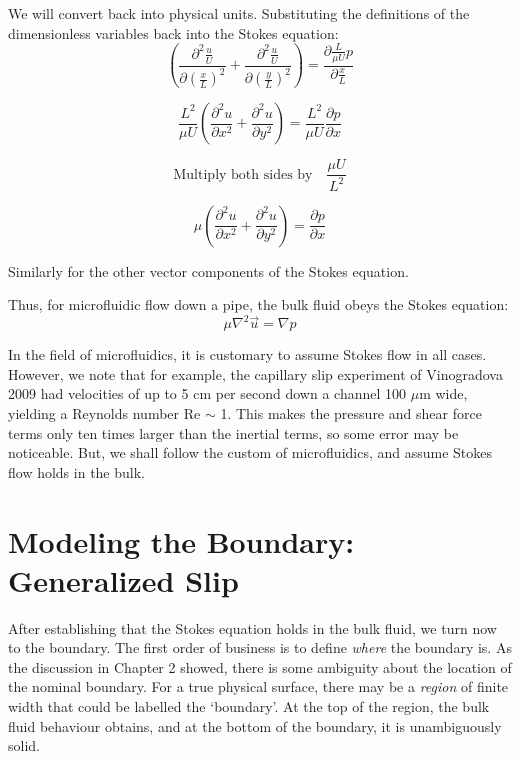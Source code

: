 \documentclass[a4paper]{report}
\begin{document}
We will convert back into physical units. Substituting the definitions of the dimensionless variables back into the Stokes equation:
\begin{equation}
\left( \frac{\partial^2  \frac{u}{U}}{\partial (\frac{x}{L})^2} + 
\frac{\partial^2 \frac{u}{U}}{\partial (\frac{y}{L})^2} \right) =
\frac{\partial \frac{L}{\mu U} p}{\partial \frac{x}{L}}
\end{equation}

\begin{equation}
 \frac{L^2}{\mu U} \left( \frac{\partial^2 u}{\partial x^2} + 
\frac{\partial^2 u}{\partial y^2} \right) =
\frac{L^2}{\mu U}  \frac{\partial p}{\partial x}
\end{equation}

\begin{equation}
\text{Multiply both sides by} \quad \frac{\mu U}{L^2}
\end{equation}

\begin{equation}
\mu \left( \frac{\partial^2 u}{\partial x^2} + 
\frac{\partial^2 u}{\partial y^2} \right) =
\frac{\partial p}{\partial x}
\end{equation}

Similarly for the other vector components of the Stokes equation.

\vspace*{1em}
Thus, for microfluidic flow down a pipe, the bulk fluid obeys the Stokes equation:
\begin{equation}
\mu \nabla^2 \vec{u} = \nabla p
\end{equation}

In the field of microfluidics, it is customary to assume Stokes flow in all cases. However, we note that for example, the capillary slip experiment of Vinogradova 2009 \cite{Vinogradova2009} had velocities of up to 5 cm per second down a channel 100 $\mu$m wide, yielding a Reynolds number Re $\sim$ 1.  This makes the pressure and shear force terms only ten times larger than the inertial terms, so some error may be noticeable.
But, we shall follow the custom of microfluidics, and assume Stokes flow holds in the bulk.





\section*{Modeling the Boundary: Generalized Slip}
After establishing that the Stokes equation holds in the bulk fluid, we turn now to the boundary.  The first order of business is to define \emph{where} the boundary is.  As the discussion in Chapter 2 showed, there is some ambiguity about the location of the nominal boundary.  For a true physical surface, there may be a \emph{region} of finite width that could be labelled the `boundary'.  At the top of the region, the bulk fluid behaviour obtains, and at the bottom of the boundary, it is unambiguously solid.  
\end{document}
